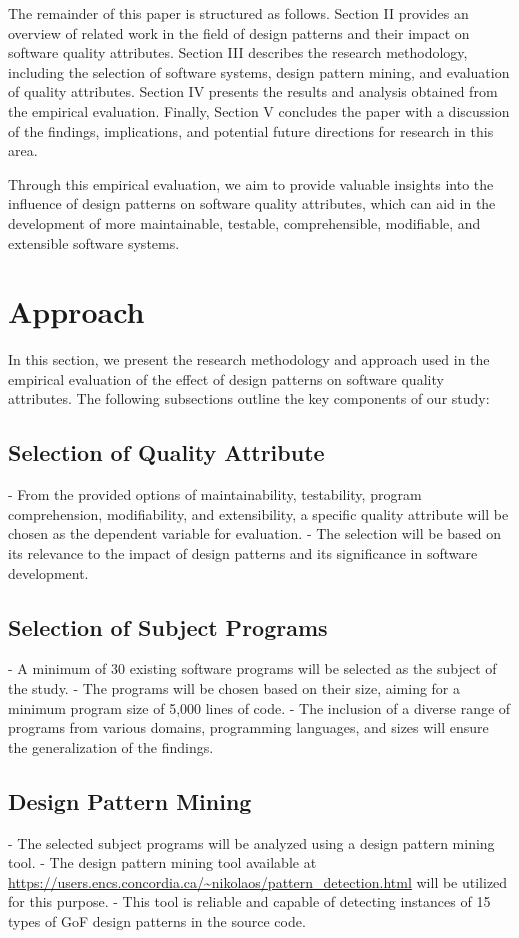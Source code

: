\documentclass[conference]{IEEEtran}
\begin{document}
	The remainder of this paper is structured as follows. Section II provides an overview of related work in the field of design patterns and their impact on software quality attributes. Section III describes the research methodology, including the selection of software systems, design pattern mining, and evaluation of quality attributes. Section IV presents the results and analysis obtained from the empirical evaluation. Finally, Section V concludes the paper with a discussion of the findings, implications, and potential future directions for research in this area.
	
	Through this empirical evaluation, we aim to provide valuable insights into the influence of design patterns on software quality attributes, which can aid in the development of more maintainable, testable, comprehensible, modifiable, and extensible software systems.
	\section{Approach}
	In this section, we present the research methodology and approach used in the empirical evaluation of the effect of design patterns on software quality attributes. The following subsections outline the key components of our study: 
	
	\subsection{Selection of Quality Attribute}
	- From the provided options of maintainability, testability, program comprehension, modifiability, and extensibility, a specific quality attribute will be chosen as the dependent variable for evaluation.
	- The selection will be based on its relevance to the impact of design patterns and its significance in software development.
	
	\subsection{Selection of Subject Programs}
	- A minimum of 30 existing software programs will be selected as the subject of the study.
	- The programs will be chosen based on their size, aiming for a minimum program size of 5,000 lines of code.
	- The inclusion of a diverse range of programs from various domains, programming languages, and sizes will ensure the generalization of the findings.
	
	\subsection{Design Pattern Mining}
	- The selected subject programs will be analyzed using a design pattern mining tool.
	- The design pattern mining tool available at \url {https://users.encs.concordia.ca/~nikolaos/pattern_detection.html} will be utilized for this purpose.
	- This tool is reliable and capable of detecting instances of 15 types of GoF design patterns in the source code.
	
\end{document}
